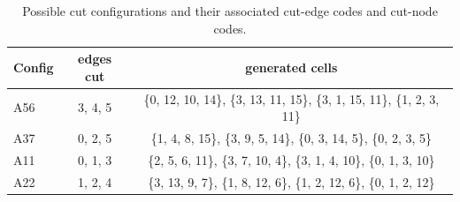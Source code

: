 \begin{table}[H]
\begin{center}
\caption{\label{table:speedup}{Possible cut configurations and their associated cut-edge codes and cut-node codes.}}
  \begin{tabular}{ | l | c | c | }
    \hline    
    Config & edges cut & generated cells \\ \hline \hline    
    A56 & 3, 4, 5 & \{0, 12, 10, 14\}, \{3, 13, 11, 15\}, \{3, 1, 15, 11\}, \{1, 2, 3, 11\} \\ \hline
    A37 & 0, 2, 5 & \{1, 4, 8, 15\}, \{3, 9, 5, 14\}, \{0, 3, 14, 5\}, \{0, 2, 3, 5\} \\ \hline
    A11 & 0, 1, 3 & \{2, 5, 6, 11\}, \{3, 7, 10, 4\}, \{3, 1, 4, 10\}, \{0, 1, 3, 10\} \\ \hline
    A22 & 1, 2, 4 & \{3, 13, 9, 7\}, \{1, 8, 12, 6\}, \{1, 2, 12, 6\}, \{0, 1, 2, 12\} \\ \hline
    \hline
  \end{tabular}
\end{center}
\end{table}



